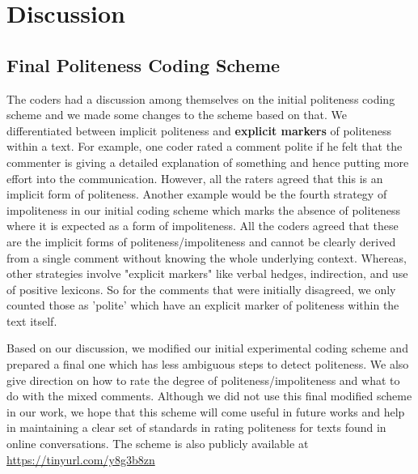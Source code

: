 \section{Discussion}
\subsection{Final Politeness Coding Scheme} \label{finalpolscheme}

The coders had a discussion among themselves on the initial politeness coding scheme and we made some changes to the scheme based on that. We differentiated between implicit politeness and \textbf{explicit markers} of politeness within a text. For example, one coder rated a comment polite if he felt that the commenter is giving a detailed explanation of something and hence putting more effort into the communication. However, all the raters agreed that this is an implicit form of politeness. Another example would be the fourth strategy of impoliteness in our initial coding scheme which marks the absence of politeness where it is expected as a form of impoliteness. All the coders agreed that these are the implicit forms of politeness/impoliteness and cannot be clearly derived from a single comment without knowing the whole underlying context. Whereas, other strategies involve "explicit markers" like verbal hedges, indirection, and use of positive lexicons. So for the comments that were initially disagreed, we only counted those as 'polite' which have an explicit marker of politeness within the text itself.

Based on our discussion, we modified our initial experimental coding scheme and prepared a final one which has less ambiguous steps to detect politeness. We also give direction on how to rate the degree of politeness/impoliteness and what to do with the mixed comments. Although we did not use this final modified scheme in our work, we hope that this scheme will come useful in future works and help in maintaining a clear set of standards in rating politeness for texts found in online conversations. The scheme is also publicly available at \href{https://tinyurl.com/y8g3b8zn}{https://tinyurl.com/y8g3b8zn}

